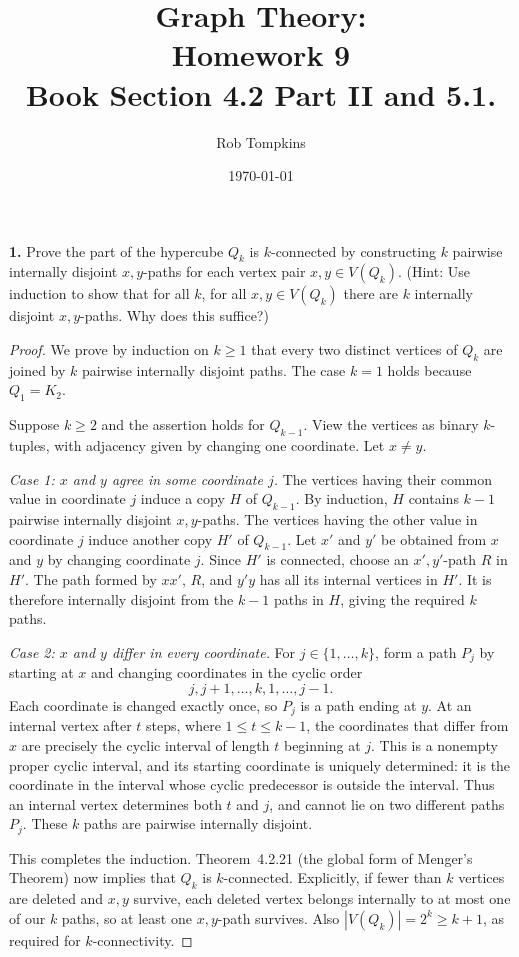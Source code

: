 \documentclass[12pt]{amsart}
\title{Graph Theory:\\Homework 9\\ Book Section 4.2 Part II and 5.1.}
\author{Rob Tompkins}
\date{\today}
\theoremstyle{conjecture}
\theoremstyle{definition}
\theoremstyle{question}
\theoremstyle{theorem}
\begin{document}
    \maketitle

    \noindent\textbf{1.} Prove the part of the hypercube $Q_k$ is $k$-connected by constructing
    $k$ pairwise internally disjoint $x,y$-paths for each vertex pair $x,y\in V(Q_k)$.
    (Hint: Use induction to show that for all $k$, for all $x,y\in V(Q_k)$ there are $k$
    internally disjoint $x,y$-paths.
    Why does this suffice?)

    \begin{proof}
        We prove by induction on $k\geq 1$ that every two distinct vertices of
        $Q_k$ are joined by $k$ pairwise internally disjoint paths.  The case
        $k=1$ holds because $Q_1=K_2$.

        Suppose $k\geq2$ and the assertion holds for $Q_{k-1}$.  View the
        vertices as binary $k$-tuples, with adjacency given by changing one
        coordinate.  Let $x\ne y$.

        \emph{Case 1: $x$ and $y$ agree in some coordinate $j$.}
        The vertices having their common value in coordinate $j$ induce a copy
        $H$ of $Q_{k-1}$.  By induction, $H$ contains $k-1$ pairwise internally
        disjoint $x,y$-paths.  The vertices having the other value in coordinate
        $j$ induce another copy $H'$ of $Q_{k-1}$.  Let $x'$ and $y'$ be obtained
        from $x$ and $y$ by changing coordinate $j$.  Since $H'$ is connected,
        choose an $x',y'$-path $R$ in $H'$.  The path formed by $xx'$, $R$, and
        $y'y$ has all its internal vertices in $H'$.  It is therefore internally
        disjoint from the $k-1$ paths in $H$, giving the required $k$ paths.

        \emph{Case 2: $x$ and $y$ differ in every coordinate.}
        For $j\in\{1,\ldots,k\}$, form a path $P_j$ by starting at $x$ and
        changing coordinates in the cyclic order
        \[
            j,j+1,\ldots,k,1,\ldots,j-1.
        \]
        Each coordinate is changed exactly once, so $P_j$ is a path ending at
        $y$.  At an internal vertex after $t$ steps, where $1\leq t\leq k-1$,
        the coordinates that differ from $x$ are precisely the cyclic interval
        of length $t$ beginning at $j$.  This is a nonempty proper cyclic
        interval, and its starting coordinate is uniquely determined: it is
        the coordinate in the interval whose cyclic predecessor is outside the
        interval.  Thus an internal vertex determines both $t$ and $j$, and
        cannot lie on two different paths $P_j$.  These $k$ paths are pairwise
        internally disjoint.

        This completes the induction.  Theorem~4.2.21 (the global form of
        Menger's Theorem) now implies that $Q_k$ is $k$-connected.  Explicitly,
        if fewer than $k$ vertices are deleted and $x,y$ survive, each deleted
        vertex belongs internally to at most one of our $k$ paths, so at least
        one $x,y$-path survives.  Also $|V(Q_k)|=2^k\geq k+1$, as required
        for $k$-connectivity.
    \end{proof}
\end{document}
